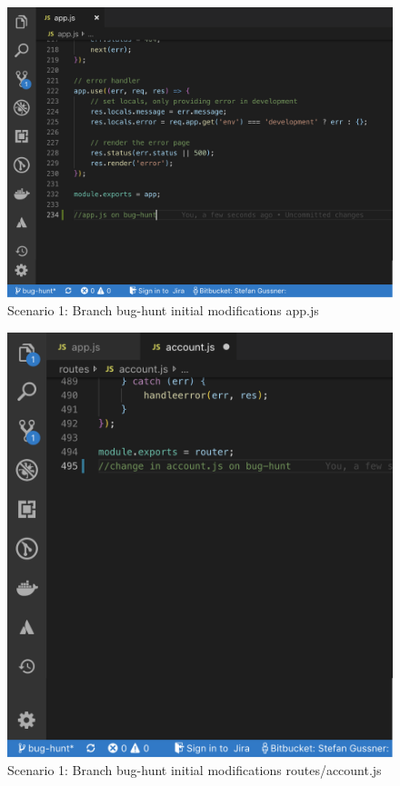 \begin{figure}
    \centering
    \includegraphics[width=1\linewidth]{figures/screenshots/scenarios/1appjs_on_bughunt.png}
    \caption{Scenario 1: Branch bug-hunt initial modifications app.js}
    \label{fig:1appjs_on_bughunt}
    \end{figure}
\begin{figure}
    \centering
    \includegraphics[width=1\linewidth]{figures/screenshots/scenarios/1accountjs_on_bughunt.png}
    \caption{Scenario 1: Branch bug-hunt initial modifications routes/account.js}
    \label{fig:1account_on_bughunt}
\end{figure}



